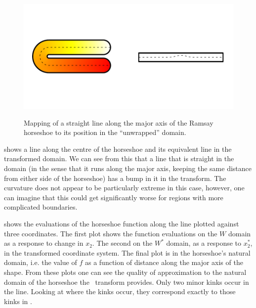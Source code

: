 \begin{figure}
\centering
\includegraphics[trim=0.5in 1in 0in 1in]{sc/figs/horseshoecentreline.pdf} \\
\caption{Mapping of a straight line along the major axis of the Ramsay horseshoe to its position in the ``unwrapped'' domain.}
\label{horseshoecentreline}
\end{figure}

 shows a line along the centre of the horseshoe and its equivalent line in the transformed domain. We can see from this that a line that is straight in the domain (in the sense that it runs along the major axis, keeping the same distance from either side of the horseshoe) has a bump in it in the transform. The curvature does not appear to be particularly extreme in this case, however, one can imagine that this could get significantly worse for regions with more complicated boundaries.

 shows the evaluations of the horseshoe function along the line plotted against three coordinates. The first plot shows the function evaluations on the $W$ domain as a response to change in $x_2$. The second on the $W^*$ domain, as a response to $x_2^*$, in the transformed coordinate system. The final plot is in the horseshoe's natural domain, i.e. the value of $f$ as a function of distance along the major axis of the shape. From these plots one can see the quality of approximation to the natural domain of the horseshoe the \sch\ transform provides. Only two minor kinks occur in the line. Looking at where the kinks occur, they correspond exactly to those kinks in . 

